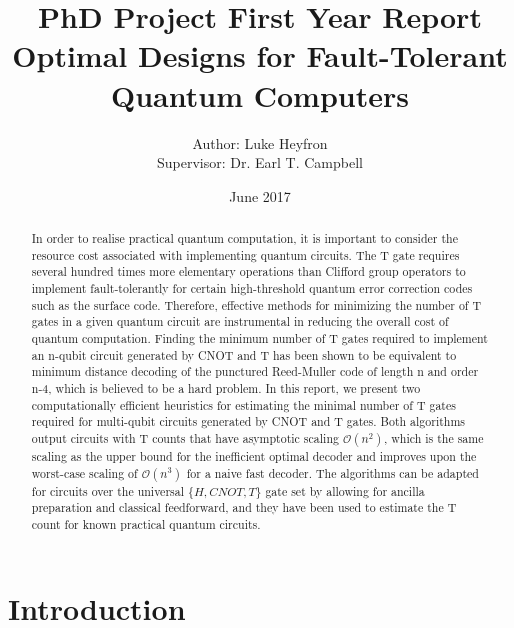 \documentclass{article}
\title{PhD Project First Year Report\\Optimal Designs for Fault-Tolerant Quantum Computers}
\author{Author: Luke Heyfron\\Supervisor: Dr. Earl T. Campbell}
\date{June 2017}
\theoremstyle{definition}
\theoremstyle{problem}
\theoremstyle{lemma}
\begin{document}
	\captionsetup{width=0.8\linewidth}
	\maketitle
	
	\begin{abstract}
		In order to realise practical quantum computation, it is important to consider the resource cost associated with implementing quantum circuits. The T gate requires several hundred times more elementary operations than Clifford group operators to implement fault-tolerantly for certain high-threshold quantum error correction codes such as the surface code. Therefore, effective methods for minimizing the number of T gates in a given quantum circuit are instrumental in reducing the overall cost of quantum computation. Finding the minimum number of T gates required to implement an n-qubit circuit generated by CNOT and T has been shown to be equivalent to minimum distance decoding of the punctured Reed-Muller code of length n and order n-4, which is believed to be a hard problem. In this report, we present two computationally efficient heuristics for estimating the
		minimal number of T gates required for multi-qubit circuits generated by CNOT and T gates. Both algorithms output circuits with T counts that have asymptotic scaling $\mathcal{O}(n^2)$, which is the same scaling as the upper bound for the inefficient optimal decoder and improves upon the worst-case scaling of $\mathcal{O}(n^3)$ for a naive fast decoder. The algorithms can be adapted for circuits over the universal $\{H,CNOT,T\}$ gate set by allowing for ancilla preparation and classical feedforward, and they have been used to estimate the T count for known practical quantum circuits.
	\end{abstract}
	
	\section{Introduction}
	
\end{document}

